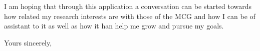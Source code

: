 \documentclass[a4paper]{letter}
\begin{document}
\begin{letter}{}
I am hoping that through this application a conversation can be started towards
how related my research interests are with those of the MCG and how I can be of
assistant to it as well as how it han help me grow and pursue my goals. 

\closing{Yours sincerely,} 

\end{letter}

\newpage

\end{document}
